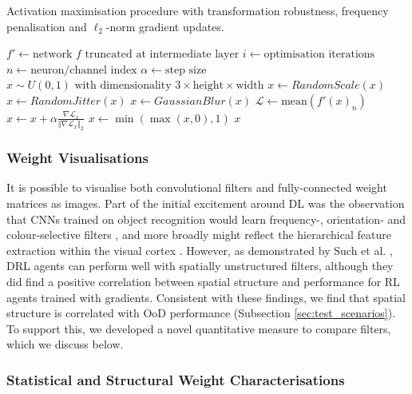 \begin{algorithm}
\caption{Activation maximisation procedure with transformation robustness, frequency penalisation and $\ell_2$-norm gradient updates.}
\label{alg:act_max}
\begin{algorithmic}
\STATE $f' \gets \text{network } f \text{ truncated at intermediate layer}$
\STATE $i \gets \text{optimisation iterations}$
\STATE $n \gets \text{neuron/channel index}$
\STATE $\alpha \gets \text{step size}$
\STATE $x \sim U(0, 1) \text{ with dimensionality } 3 \times \text{height} \times \text{width}$
  \STATE $x \gets RandomScale(x)$
  \STATE $x \gets RandomJitter(x)$
  \STATE $x \gets GaussianBlur(x)$
  \STATE $\mathcal{L} \gets \text{mean}(f'(x)_n)$
  \STATE $x \gets x + \alpha\frac{\nabla\mathcal{L}_x}{\Vert \nabla\mathcal{L}_x \Vert_2}$
  \STATE $x \gets \min(\max(x, 0), 1)$
\ENDFOR
\RETURN $x$
\end{algorithmic}
\end{algorithm}

\hypertarget{weight-visualisations}{%
\subsubsection{Weight Visualisations}\label{weight-visualisations}}

\label{sec:weight_vis}

It is possible to visualise both convolutional filters and
fully-connected weight matrices as images. Part of the initial
excitement around DL was the observation that CNNs trained on object
recognition would learn frequency-, orientation- and colour-selective
filters \cite{krizhevsky2012imagenet}, and more broadly might reflect
the hierarchical feature extraction within the visual cortex
\cite{yamins2016using}. However, as demonstrated by Such et al.
\cite{such2018atari}, DRL agents can perform well with spatially
unstructured filters, although they did find a positive correlation
between spatial structure and performance for RL agents trained with
gradients. Consistent with these findings, we find that spatial
structure is correlated with OoD performance (Subsection
\ref{sec:test_scenarios}). To support this, we developed a novel
quantitative measure to compare filters, which we discuss below.

\hypertarget{statistical-and-structural-weight-characterisations}{%
\subsubsection{Statistical and Structural Weight
Characterisations}\label{statistical-and-structural-weight-characterisations}}

